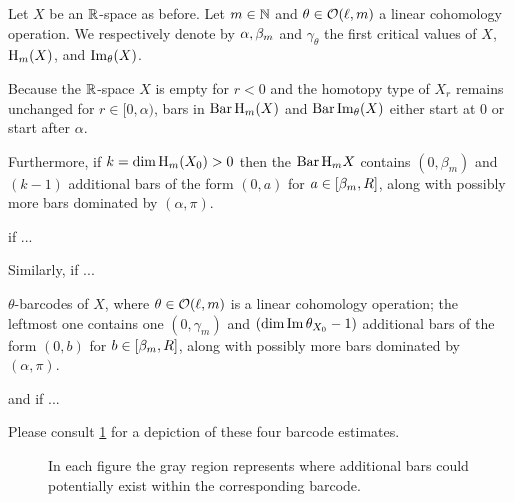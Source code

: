\subsubsection{}\label{subsub:barcode_general}

Let $X$ be an $\mathbb{R}$-space as before.
Let \(m \in \mathbb{N}\) and \(\theta \in \mathcal{O}(\ell,m)\) a linear cohomology operation.
We respectively denote by $\alpha, \beta_m$ and $\gamma_\theta$ the first critical values of $X$, \(\mathrm{H}_m(X)\), and \(\operatorname{Im}_\theta(X)\).

Because the $\mathbb{R}$-space $X$ is empty for \(r < 0\) and the homotopy type of $X_r$ remains unchanged for $r \in [0, \alpha)$, bars in \(\operatorname{Bar} \mathrm{H}_m(X)\) and $\operatorname{Bar}\operatorname{Im}_\theta(X)$ either start at $0$ or start after $\alpha$.

Furthermore, if \(k = \dim \operatorname{H}_m(X_0) > 0\) then the $\operatorname{Bar}\mathrm{H}_m X$ contains $(0,\beta_m)$ and \((k - 1)\) additional bars of the form \((0, a)\) for \(a \in [\beta_m, R]\), along with possibly more bars dominated by \((\alpha, \pi)\).


if ...

Similarly, if ...

$\theta$-barcodes of $X$, where $\theta\in\mathcal{O}(\ell,m)$ is a linear cohomology operation; the leftmost one contains one \((0, \gamma_m)\) and \((\dim \operatorname{Im} \theta_{X_0} - 1)\) additional bars of the form \((0, b)\) for \(b \in [\beta_m, R]\), along with possibly more bars dominated by \((\alpha, \pi)\).

and if ...

Please consult \cref{fig:barcodes_general} for a depiction of these four barcode estimates.

\begin{figure}
	\centering
	
	\caption{In each figure the gray region represents where additional bars could potentially exist within the corresponding barcode.}
	\label{fig:barcodes_general}
\end{figure}